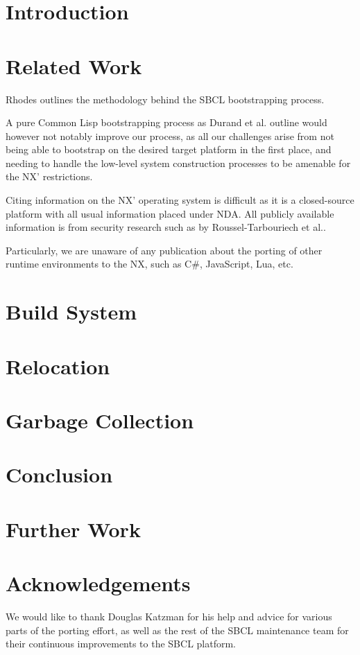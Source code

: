 \documentclass[format=sigconf]{acmart}
\begin{document}
\def\abovecaptionskip{1pt}
\def\listingautorefname{Listing}
\def\figureautorefname{Figure}

\section{Introduction}\label{introduction}


\section{Related Work}\label{relatedwork}
Rhodes\cite{rhodes2008sbcl} outlines the methodology behind the SBCL bootstrapping process.

A pure Common Lisp bootstrapping process as Durand et al.\cite{durand2019bootstrapping} outline would however not notably improve our process, as all our challenges arise from not being able to bootstrap on the desired target platform in the first place, and needing to handle the low-level system construction processes to be amenable for the NX' restrictions.

Citing information on the NX' operating system is difficult as it is a closed-source platform with all usual information placed under NDA. All publicly available information is from security research such as by Roussel-Tarbouriech et al.\cite{roussel2019methodically}.

Particularly, we are unaware of any publication about the porting of other runtime environments to the NX, such as C\#, JavaScript, Lua, etc.

\section{Build System}\label{build}

\section{Relocation}\label{relocation}

\section{Garbage Collection}\label{gc}

\section{Conclusion}\label{conclusion}

\section{Further Work}\label{further-work}


\section{Acknowledgements}\label{acknowledgements}
We would like to thank Douglas Katzman for his help and advice for various parts of the porting effort, as well as the rest of the SBCL maintenance team for their continuous improvements to the SBCL platform.


\end{document}
